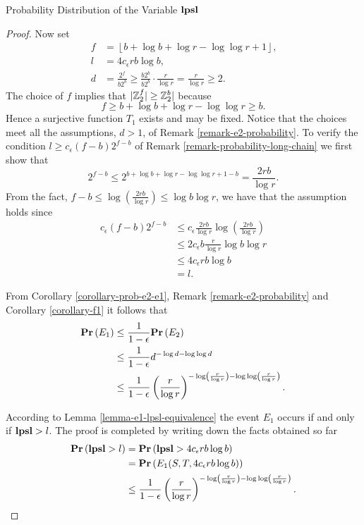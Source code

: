 \begin{section}{Probability Distribution of the Variable \texorpdfstring{$\mathbf{lpsl}$}{lpsl}}
\begin{proof}
Now set 
\[
\begin{split}
	f & = \left\lfloor b + \log b + \log r - \log \log r + 1 \right\rfloor \text{,} \\
	l & = 4c_{\epsilon}r b \log b \text{,} \\
	d & = \frac{2 ^ f}{b 2 ^ b} \geq \frac{b 2 ^ b}{b 2 ^ b} \cdot \frac{r}{\log r} = \frac{r}{\log r} \geq 2 \text{.}
\end{split}
\]
The choice of $f$ implies that $|\mathbb{Z}_{2}^{f}| \geq \mathbb{Z}_{2}^{b}|$ because 
\[ 
f \geq b + \log b + \log r - \log \log r \geq b \text{.}
\]
Hence a surjective function $T_1$ exists and may be fixed. Notice that the choices meet all the assumptions, $d > 1$, of Remark \ref{remark-e2-probability}. To verify the condition $l \geq c_\epsilon (f - b) 2 ^ {f - b}$ of Remark \ref{remark-probability-long-chain} we first show that
\[
	2 ^ {f - b} \leq 2 ^ {b + \log b + \log r - \log \log r + 1 - b} = \frac{2 r b}{\log r} \text{.}
\]
From the fact, $f - b \leq \log \left(\frac{2 r b}{\log r}\right) \leq \log b \log r$, we have that the assumption holds since
\[
\begin{split}
c_{\epsilon}(f - b) 2 ^ {f - b}
	& \leq c_{\epsilon} \frac{2 r b}{\log r} \log \left(\frac{2 r b}{\log r}\right) \\
	& \leq 2 c_{\epsilon} b \frac{r}{\log r} \log b \log r \\
	& \leq 4 c_{\epsilon} r b \log b \\
	& = l \text{.}
\end{split}
\]

From Corollary \ref{corollary-prob-e2-e1}, Remark \ref{remark-e2-probability} and Corollary \ref{corollary-f1} it follows that
\[
\begin{split}
\mathbf{Pr}\left(E_1\right)
	& \leq \frac{1}{1 - \epsilon} \mathbf{Pr}\left(E_2\right) \\
	& \leq \frac{1}{1 - \epsilon} d ^ {-\log d - \log \log d} \\ 
	& \leq \frac{1}{1 - \epsilon} \left(\frac{r}{\log r}\right)^{-\log \left(\frac{r}{\log r}\right) - \log \log \left(\frac{r}{\log r}\right)} \text{.}
\end{split}
\]

According to Lemma \ref{lemma-e1-lpsl-equivalence} the event $E_1$ occurs if and only if $\mathbf{lpsl} > l$. The proof is completed by writing down the facts obtained so far
\[
\begin{split}
\mathbf{Pr}\left(\mathbf{lpsl} > l\right) 
	& = \mathbf{Pr}\left(\mathbf{lpsl} > 4c_{\epsilon} r b \log b\right) \\
	& = \mathbf{Pr}\left(E_1(S, T, 4c_{\epsilon} r b \log b)\right) \\
	& \leq \frac{1}{1 - \epsilon} \left(\frac{r}{\log r}\right)^{-\log \left(\frac{r}{\log r}\right) - \log \log \left(\frac{r}{\log r}\right)} \text{.}
\end{split}
\]
\end{proof}


\end{section}
